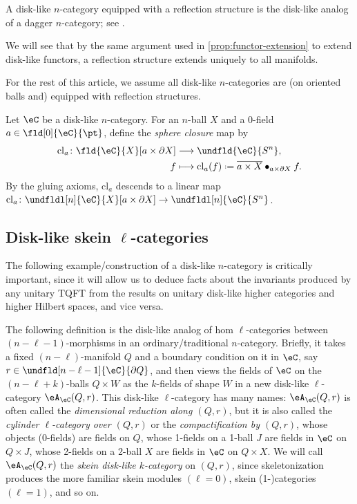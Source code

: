 \documentclass[12pt,reqno]{amsart}
\newcommand{\cl}{\mathrm{cl}}
\newcommand{\A}{\eA}
\newcommand{\C}{\eC}
\newcommand{\blt}{\bullet}
\newcommand{\fcj}[1]{\overline{#1}}
\newcommand{\defn}[1]{\emph{#1}}
\DeclareRobustCommand{\coloneq}{\mathrel{\vcenter{\baselineskip0.5ex\lineskiplimit0pt\hbox{\scriptsize{\upshape.}}\hbox{\scriptsize{\upshape.}}}}=}
\begin{document}
\begin{convention}
A disk-like $n$-category equipped with a reflection structure is the disk-like analog of a dagger $n$-category; see \cite{FHJF24}.
\end{convention}

We will see that by the same argument used in \cref{prop:functor-extension} to extend disk-like functors, a reflection structure extends uniquely to all manifolds.

\begin{convention}
For the rest of this article, we assume all disk-like $n$-categories are (on oriented balls and) equipped with reflection structures.
\end{convention}

\begin{definition}
  \label{def:closure}
  Let $\C$ be a disk-like $n$-category. For an $n$-ball $X$ and a $0$-field $a\in\fld[0]{\C}{\pt}$, define the \defn{sphere closure} map by
  \[
    \begin{aligned}
      \cl_a\colon \fld{\C}{X}[a\times\partial X] & \longrightarrow \undfld{\C}{S^n},                          \\
      f                   & \longmapsto\cl_a(f)\coloneq \fcj{a\times X}\blt_{a\times\partial X} f.
    \end{aligned}
  \]
  By the gluing axioms, $\cl_a$ descends to a linear map $\cl_a\colon\undfldl[n]{\C}{X}[a\times\partial X]\to\undfldl[n]{\C}{S^n}$.
\end{definition}

\subsection{Disk-like skein \texorpdfstring{$\ell$}{l}-categories}

The following example/construction of a disk-like $n$-category is critically important, since it will allow us to deduce facts about the invariants produced by any unitary TQFT from the results on unitary disk-like higher categories and higher Hilbert spaces, and vice versa. 

The following definition is the disk-like analog of hom $\ell$-categories between $(n-\ell-1)$-morphisms in an ordinary/traditional $n$-category. Briefly, it takes a fixed $(n-\ell)$-manifold $Q$ and a boundary condition on it in $\C$, say $r\in\undfld[n-\ell-1]{\C}{\partial Q}$, and then views the fields of $\C$ on the $(n-\ell+k)$-balls $Q\times W$ as the $k$-fields of shape $W$ in a new disk-like $\ell$-category $\A_\C(Q,r)$. This disk-like $\ell$-category has many names: $\A_\C(Q,r)$ is often called the \defn{dimensional reduction along $(Q,r)$}, but it is also called the \defn{cylinder $\ell$-category over $(Q,r)$} or the \defn{compactification by $(Q,r)$}, whose objects (0-fields) are fields on $Q$, whose 1-fields on a 1-ball $J$ are fields in $\C$ on $Q\times J$, whose 2-fields on a 2-ball $X$ are fields in $\C$ on $Q\times X$. We will call $\A_\C(Q,r)$ the  \defn{skein disk-like $k$-category} on $(Q,r)$, since skeletonization produces the more familiar skein modules $(\ell=0)$, skein (1-)categories $(\ell=1)$, and so on.  
\end{document}
